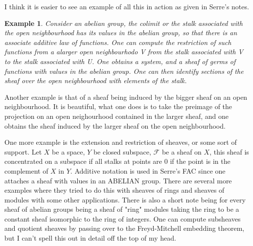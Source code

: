 \documentclass[12pt]{article}
\newtheorem{example}{Example}
\begin{document}
I think it is easier to see an example of all this in action as given in Serre's notes.

\begin{example}
    Consider an abelian group, the colimit or the stalk associated with the open neighbourhood has its values in the abelian group, so that there is an associate additive law of functions. One can compute the restriction of such functions from a alarger open neighbourhodo V from the stalk associated with V to the stalk associated with U. One obtains a system, and a sheaf of germs of functions with values in the abelian group. One can then identify sections of the sheaf over the open neighbourhood with elements of the stalk.
\end{example}

Another example is that of a sheaf being induced by the bigger sheaf on an open neighbourhood. It is beautiful, what one does is to take the preimage of the projection on an open neighourhood contained in the larger sheaf, and one obtains the sheaf induced by the larger sheaf on the open neighbourhood.

One more example is the extension and restriction of sheaves, or some sort of support. Let $X$ be a space, $Y$ be closed subspace, $\mathcal{F}$ be a sheaf on $X$, this sheaf is concentrated on a subspace if all stalks at points are $0$ if the point is in the complement of $X$ in $Y$. Additive notation is used in Serre's FAC since one attaches a sheaf with values in an ABELIAN group. There are several more examples where they tried to do this with sheaves of rings and sheaves of modules with some other applications. There is also a short note being for every sheaf of abelian groups being a sheaf of "ring" modules taking the ring to be a constant sheaf isomorphic to the ring of integers. One can compute subsheaves and quotient sheaves by passing over to the Freyd-Mitchell embedding theorem, but I can't spell this out in detail off the top of my head. 
\end{document}

